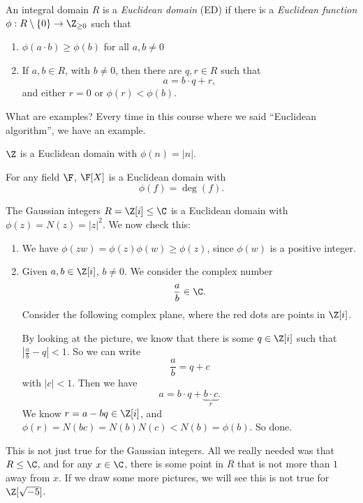 \documentclass[a4paper]{article}
\begin{document}
\begin{defi}
  An integral domain $R$ is a \emph{Euclidean domain} (ED) if there is a \emph{Euclidean function} $\phi: R\setminus \{0\} \to \Z_{\geq 0}$ such that
  \begin{enumerate}
    \item $\phi(a \cdot b) \geq \phi(b)$ for all $a, b \not= 0$
    \item If $a, b\in R$, with $b \not= 0$, then there are $q, r \in R$ such that
      \[
        a = b \cdot q + r,
      \]
     and either $r = 0$ or $\phi(r) < \phi(b)$.
  \end{enumerate}
\end{defi}

What are examples? Every time in this course where we said ``Euclidean algorithm'', we have an example.
\begin{eg}
  $\Z$ is a Euclidean domain with $\phi(n) = |n|$.
\end{eg}

\begin{eg}
  For any field $\F$, $\F[X]$ is a Euclidean domain with
  \[
    \phi(f) = \deg(f).
  \]
\end{eg}

\begin{eg}
  The Gaussian integers $R = \Z[i] \leq \C$ is a Euclidean domain with $\phi(z) = N(z) = |z|^2$. We now check this:
  \begin{enumerate}
    \item We have $\phi(zw) = \phi(z)\phi(w) \geq \phi(z)$, since $\phi(w)$ is a positive integer.
    \item Given $a, b\in \Z[i]$, $b\not= 0$. We consider the complex number
      \[
        \frac{a}{b} \in \C.
      \]
      Consider the following complex plane, where the red dots are points in $\Z[i]$.
      \begin{center}
      \end{center}
      By looking at the picture, we know that there is some $q \in \Z[i]$ such that $\left|\frac{a}{b} - q\right| < 1$. So we can write
      \[
        \frac{a}{b} = q + c
      \]
      with $|c| < 1$. Then we have
      \[
        a = b\cdot q + \underbrace{b\cdot c}_r.
      \]
      We know $r = a - bq \in \Z[i]$, and $\phi(r) = N(bc) = N(b)N(c) < N(b) = \phi(b)$. So done.
  \end{enumerate}
  This is not just true for the Gaussian integers. All we really needed was that $R \leq \C$, and for any $x \in \C$, there is some point in $R$ that is not more than $1$ away from $x$. If we draw some more pictures, we will see this is not true for $\Z[\sqrt{-5}]$.
\end{eg}
\end{document}
